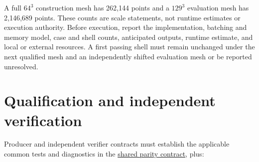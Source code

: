\documentclass[11pt]{article}
\begin{document}
A full $64^3$ construction mesh has 262,144 points and a $129^3$ evaluation mesh has
2,146,689 points.  These counts are scale statements, not runtime estimates or execution
authority.  Before execution, report the implementation, batching and memory model,
case and shell counts, anticipated outputs, runtime estimate, and local or external
resources.  A first passing shell must remain unchanged under the next qualified mesh
and an independently shifted evaluation mesh or be reported unresolved.

\section{Qualification and independent verification}

Producer and independent verifier contracts must establish the applicable common tests
and diagnostics in the
\href{../../band-equivalence-test-and-diagnostic-parity.md}{shared parity contract},
plus:
\end{document}
